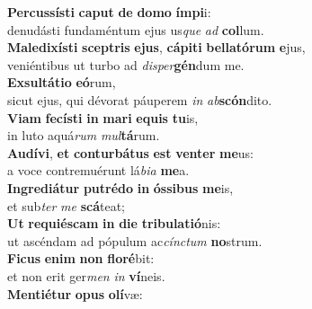 \evenverse \textbf{Per}\textbf{cus}\textbf{sí}\textbf{sti} \textbf{ca}\textbf{put} \textbf{de} \textbf{do}\textbf{mo} \textbf{ím}\textbf{pi}i:~\*\\
\evenverse denudásti fundaméntum ejus us\textit{que} \textit{ad} \textbf{col}lum.\\
\oddverse \textbf{Ma}\textbf{le}\textbf{di}\textbf{xí}\textbf{sti} \textbf{scep}\textbf{tris} \textbf{e}\textbf{jus}, \textbf{cá}\textbf{pi}\textbf{ti} \textbf{bel}\textbf{la}\textbf{tó}\textbf{rum} \textbf{e}jus,~\*\\
\oddverse veniéntibus ut turbo ad \textit{di}\textit{sper}\textbf{gén}dum me.\\
\evenverse \textbf{Ex}\textbf{sul}\textbf{tá}\textbf{ti}\textbf{o} \textbf{e}\textbf{ó}rum,~\*\\
\evenverse sicut ejus, qui dévorat páuperem \textit{in} \textit{ab}\textbf{scón}dito.\\
\oddverse \textbf{Vi}\textbf{am} \textbf{fe}\textbf{cí}\textbf{sti} \textbf{in} \textbf{ma}\textbf{ri} \textbf{e}\textbf{quis} \textbf{tu}is,~\*\\
\oddverse in luto aquá\textit{rum} \textit{mul}\textbf{tá}rum.\\
\evenverse \textbf{Au}\textbf{dí}\textbf{vi}, \textbf{et} \textbf{con}\textbf{tur}\textbf{bá}\textbf{tus} \textbf{est} \textbf{ven}\textbf{ter} \textbf{me}us:~\*\\
\evenverse a voce contremuérunt lá\textit{bi}\textit{a} \textbf{me}a.\\
\oddverse \textbf{In}\textbf{gre}\textbf{di}\textbf{á}\textbf{tur} \textbf{pu}\textbf{tré}\textbf{do} \textbf{in} \textbf{ós}\textbf{si}\textbf{bus} \textbf{me}is,~\*\\
\oddverse et sub\textit{ter} \textit{me} \textbf{scá}teat;\\
\evenverse \textbf{Ut} \textbf{re}\textbf{qui}\textbf{é}\textbf{scam} \textbf{in} \textbf{di}\textbf{e} \textbf{tri}\textbf{bu}\textbf{la}\textbf{ti}\textbf{ó}nis:~\*\\
\evenverse ut ascéndam ad pópulum ac\textit{cín}\textit{ctum} \textbf{no}strum.\\
\oddverse \textbf{Fi}\textbf{cus} \textbf{e}\textbf{nim} \textbf{non} \textbf{flo}\textbf{ré}bit:~\*\\
\oddverse et non erit ger\textit{men} \textit{in} \textbf{ví}neis.\\
\evenverse \textbf{Men}\textbf{ti}\textbf{é}\textbf{tur} \textbf{o}\textbf{pus} \textbf{o}\textbf{lí}væ:~\*\\
